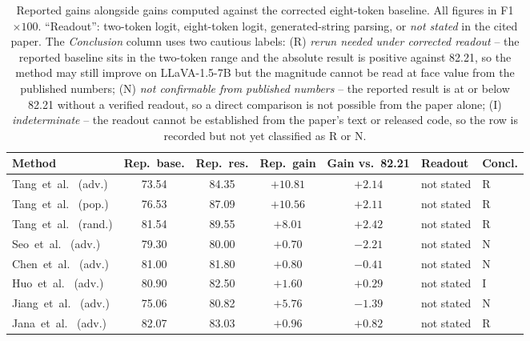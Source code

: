 \documentclass{article}
\begin{document}
\begin{table}[t]
\caption{Reported gains alongside gains computed against the corrected
eight-token baseline. All figures in F1$\times 100$.
``Readout'': two-token logit, eight-token logit, generated-string
parsing, or \emph{not stated} in the cited paper.
The \emph{Conclusion} column uses two cautious labels:
(R) \emph{rerun needed under corrected readout} -- the reported
baseline sits in the two-token range and the absolute result is
positive against 82.21, so the method may still improve on
LLaVA-1.5-7B but the magnitude cannot be read at face value from the
published numbers;
(N) \emph{not confirmable from published numbers} -- the reported
result is at or below 82.21 without a verified readout, so a direct
comparison is not possible from the paper alone;
(I) \emph{indeterminate} -- the readout cannot be established from the
paper's text or released code, so the row is recorded but not yet
classified as R or N.}
\label{tab:reeval}
\centering
\small
\setlength{\tabcolsep}{4pt}
\begin{tabular}{@{}lccccll@{}}
\toprule
Method & Rep.~base. & Rep.~res. & Rep.~gain & Gain vs.~82.21 & Readout & Concl. \\
\midrule
Tang~et~al.~\citep{visflow2025} (adv.)  & 73.54 & 84.35 & $+10.81$ & $+2.14$ & not stated & R \\
Tang~et~al.~\citep{visflow2025} (pop.)  & 76.53 & 87.09 & $+10.56$ & $+2.11$ & not stated & R \\
Tang~et~al.~\citep{visflow2025} (rand.) & 81.54 & 89.55 & $+8.01$  & $+2.42$ & not stated & R \\
Seo~et~al.~\citep{seo2025} (adv.)       & 79.30 & 80.00 & $+0.70$  & $-2.21$ & not stated & N \\
Chen~et~al.~\citep{adaptvis2025} (adv.) & 81.00 & 81.80 & $+0.80$  & $-0.41$ & not stated & N \\
Huo~et~al.~\citep{huo2024sid} (adv.)    & 80.90 & 82.50 & $+1.60$  & $+0.29$ & not stated & I \\
Jiang~et~al.~\citep{jiang2026pnd} (adv.)& 75.06 & 80.82 & $+5.76$  & $-1.39$ & not stated & N \\
Jana~et~al.~\citep{jana2026bracs} (adv.)& 82.07 & 83.03 & $+0.96$  & $+0.82$ & not stated & R \\
\bottomrule
\end{tabular}
\end{table}
\end{document}
